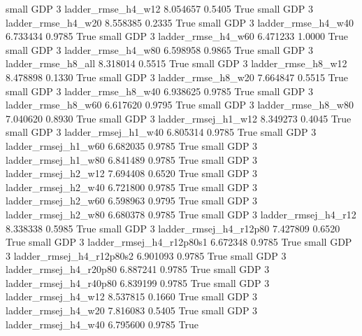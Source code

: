      small      GDP                 3       ladder_rmse_h4_w12   8.054657      0.5405    True
     small      GDP                 3       ladder_rmse_h4_w20   8.558385      0.2335    True
     small      GDP                 3       ladder_rmse_h4_w40   6.733434      0.9785    True
     small      GDP                 3       ladder_rmse_h4_w60   6.471233      1.0000    True
     small      GDP                 3       ladder_rmse_h4_w80   6.598958      0.9865    True
     small      GDP                 3       ladder_rmse_h8_all   8.318014      0.5515    True
     small      GDP                 3       ladder_rmse_h8_w12   8.478898      0.1330    True
     small      GDP                 3       ladder_rmse_h8_w20   7.664847      0.5515    True
     small      GDP                 3       ladder_rmse_h8_w40   6.938625      0.9785    True
     small      GDP                 3       ladder_rmse_h8_w60   6.617620      0.9795    True
     small      GDP                 3       ladder_rmse_h8_w80   7.040620      0.8930    True
     small      GDP                 3      ladder_rmsej_h1_w12   8.349273      0.4045    True
     small      GDP                 3      ladder_rmsej_h1_w40   6.805314      0.9785    True
     small      GDP                 3      ladder_rmsej_h1_w60   6.682035      0.9785    True
     small      GDP                 3      ladder_rmsej_h1_w80   6.841489      0.9785    True
     small      GDP                 3      ladder_rmsej_h2_w12   7.694408      0.6520    True
     small      GDP                 3      ladder_rmsej_h2_w40   6.721800      0.9785    True
     small      GDP                 3      ladder_rmsej_h2_w60   6.598963      0.9795    True
     small      GDP                 3      ladder_rmsej_h2_w80   6.680378      0.9785    True
     small      GDP                 3      ladder_rmsej_h4_r12   8.338338      0.5985    True
     small      GDP                 3   ladder_rmsej_h4_r12p80   7.427809      0.6520    True
     small      GDP                 3 ladder_rmsej_h4_r12p80s1   6.672348      0.9785    True
     small      GDP                 3 ladder_rmsej_h4_r12p80s2   6.901093      0.9785    True
     small      GDP                 3   ladder_rmsej_h4_r20p80   6.887241      0.9785    True
     small      GDP                 3   ladder_rmsej_h4_r40p80   6.839199      0.9785    True
     small      GDP                 3      ladder_rmsej_h4_w12   8.537815      0.1660    True
     small      GDP                 3      ladder_rmsej_h4_w20   7.816083      0.5405    True
     small      GDP                 3      ladder_rmsej_h4_w40   6.795600      0.9785    True
